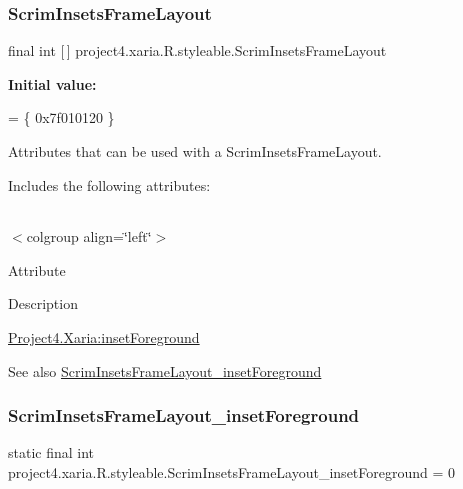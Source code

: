 \subsubsection{\texorpdfstring{Scrim\+Insets\+Frame\+Layout}{ScrimInsetsFrameLayout}}
{\footnotesize\ttfamily final int \mbox{[}$\,$\mbox{]} project4.\+xaria.\+R.\+styleable.\+Scrim\+Insets\+Frame\+Layout\hspace{0.3cm}{\ttfamily [static]}}

{\bfseries Initial value\+:}
\begin{DoxyCode}
= \{
            0x7f010120
        \}
\end{DoxyCode}
Attributes that can be used with a Scrim\+Insets\+Frame\+Layout. 

Includes the following attributes\+:

\tabulinesep=1mm
\begin{longtabu} spread 0pt [c]{*{0}{|X[-1]}|}
\hline
\end{longtabu}
$<$colgroup align=\char`\"{}left\char`\"{}$>$ 

Attribute

Description 

{\ttfamily \hyperlink{classproject4_1_1xaria_1_1R_1_1styleable_aee9aa1668c508a1199d8a4083336018f}{Project4.\+Xaria\+:inset\+Foreground}}

\begin{DoxySeeAlso}{See also}
\hyperlink{classproject4_1_1xaria_1_1R_1_1styleable_aee9aa1668c508a1199d8a4083336018f}{Scrim\+Insets\+Frame\+Layout\+\_\+inset\+Foreground} 
\end{DoxySeeAlso}
\mbox{\label{classproject4_1_1xaria_1_1R_1_1styleable_aee9aa1668c508a1199d8a4083336018f}} 
\subsubsection{\texorpdfstring{Scrim\+Insets\+Frame\+Layout\+\_\+inset\+Foreground}{ScrimInsetsFrameLayout\_insetForeground}}
{\footnotesize\ttfamily static final int project4.\+xaria.\+R.\+styleable.\+Scrim\+Insets\+Frame\+Layout\+\_\+inset\+Foreground = 0\hspace{0.3cm}{\ttfamily [static]}}

